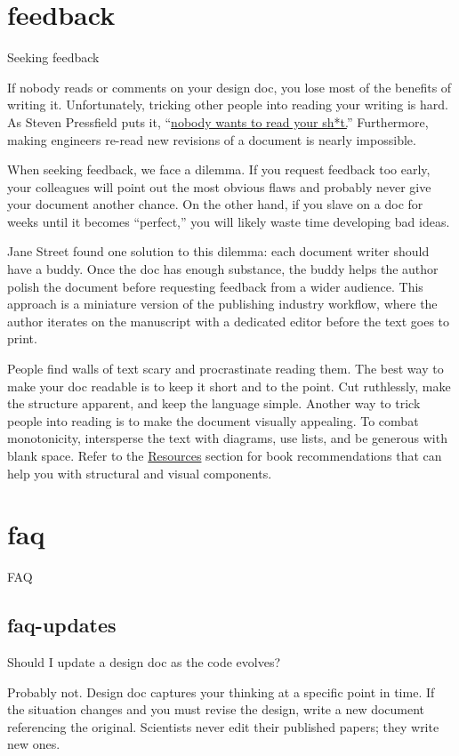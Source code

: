 \documentclass{article}
\begin{document}
\section{feedback}{Seeking feedback}

If nobody reads or comments on your design doc, you lose most of the benefits of writing it.
Unfortunately, tricking other people into reading your writing is hard.
As Steven Pressfield puts it, ``\href{https://www.amazon.com/gp/product/B01GZ1TJBI}{nobody wants to read your sh*t.}''
Furthermore, making engineers re-read new revisions of a document is nearly impossible.

When seeking feedback, we face a dilemma.
If you request feedback too early, your colleagues will point out the most obvious flaws and probably never give your document another chance.
On the other hand, if you slave on a doc for weeks until it becomes ``perfect,'' you will likely waste time developing bad ideas.

Jane Street found one solution to this dilemma: each document writer should have a buddy.
Once the doc has enough substance, the buddy helps the author polish the document before requesting feedback from a wider audience.
This approach is a miniature version of the publishing industry workflow, where the author iterates on the manuscript with a dedicated editor before the text goes to print.

People find walls of text scary and procrastinate reading them.
The best way to make your doc readable is to keep it short and to the point.
Cut ruthlessly, make the structure apparent, and keep the language simple.
Another way to trick people into reading is to make the document visually appealing.
To combat monotonicity, intersperse the text with diagrams, use lists, and be generous with blank space.
Refer to the \href{#resources}{Resources} section for book recommendations that can help you with structural and visual components.

\section{faq}{FAQ}

\subsection{faq-updates}{Should I update a design doc as the code evolves?}

Probably not.
Design doc captures your thinking at a specific point in time.
If the situation changes and you must revise the design, write a new document referencing the original.
Scientists never edit their published papers; they write new ones.
\end{document}

